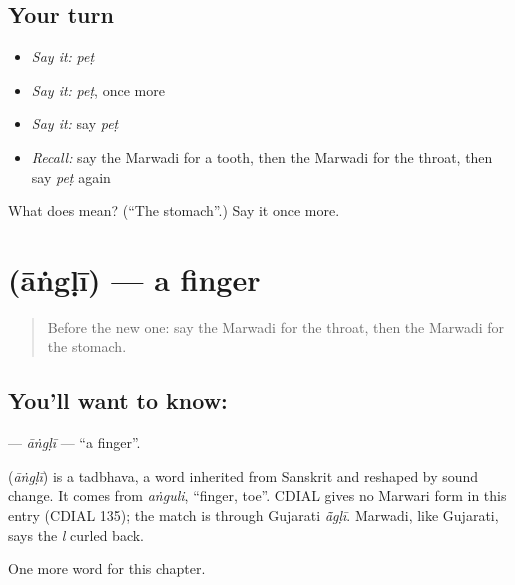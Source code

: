 \subsection*{Your turn}
\begin{itemize}
\raggedright
  \item \emph{Say it:} \emph{peṭ}
  \item \emph{Say it:} \emph{peṭ}, once more
  \item \emph{Say it:} say \emph{peṭ}
  \item \emph{Recall:} say the Marwadi for a tooth, then the Marwadi for the throat, then say \emph{peṭ} again
\end{itemize}

\begin{tcolorbox}[breakable,colback=teal!4,colframe=teal!35!black,title={Before you move on}]
What does  mean? (\textquotedblleft{}The stomach\textquotedblright{}.) Say it once more.
\end{tcolorbox}
\section[\texorpdfstring{\mw{आंगळी} (āṅgḷī)}{आंगळी (āṅgḷī)}]{ (āṅgḷī) — a finger}

\label{lesson:MW-C45-angli}



\begin{quote}
Before the new one: say the Marwadi for the throat, then the Marwadi for the stomach.
\end{quote}

\subsection*{You'll want to know: }
\textbf{} — \emph{āṅgḷī} — \textquotedblleft{}a finger\textquotedblright{}.

\begin{cousinweb}
\textbf{} (\emph{āṅgḷī}) is a tadbhava, a word inherited from Sanskrit and reshaped by sound change. It comes from \emph{aṅguli}, \textquotedblleft{}finger, toe\textquotedblright{}. CDIAL gives no Marwari form in this entry (CDIAL 135); the match is through Gujarati \emph{ā̃gḷī}. Marwadi, like Gujarati, says the \emph{l} curled back.
\end{cousinweb}

\begin{grammarlens}[title={What you've built}]
One more word for this chapter.
\end{grammarlens}

